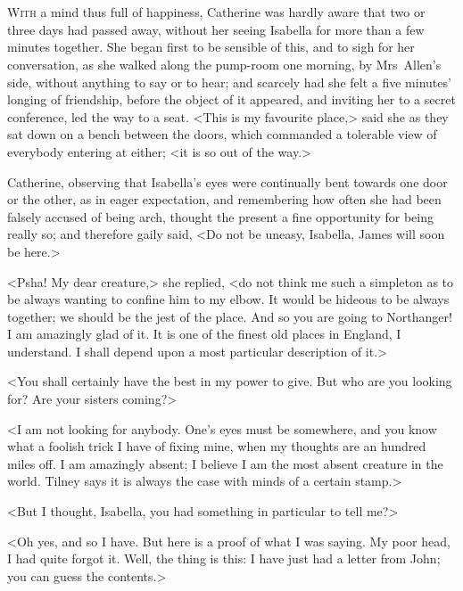 \chapter[Chapter \thechapter]{} 

 \lettrine{W}{ith} a mind thus full of happiness, Catherine was hardly aware that two or three days had passed away, without her seeing Isabella for more than a few minutes together. She began first to be sensible of this, and to sigh for her conversation, as she walked along the pump-room one morning, by Mrs~Allen's side, without anything to say or to hear; and scarcely had she felt a five minutes' longing of friendship, before the object of it appeared, and inviting her to a secret conference, led the way to a seat. <This is my favourite place,> said she as they sat down on a bench between the doors, which commanded a tolerable view of everybody entering at either; <it is so out of the way.> 

 Catherine, observing that Isabella's eyes were continually bent towards one door or the other, as in eager expectation, and remembering how often she had been falsely accused of being arch, thought the present a fine opportunity for being really so; and therefore gaily said, <Do not be uneasy, Isabella, James will soon be here.> 

 <Psha! My dear creature,> she replied, <do not think me such a simpleton as to be always wanting to confine him to my elbow. It would be hideous to be always together; we should be the jest of the place. And so you are going to Northanger! I am amazingly glad of it. It is one of the finest old places in England, I understand. I shall depend upon a most particular description of it.> 

 <You shall certainly have the best in my power to give. But who are you looking for? Are your sisters coming?> 

 <I am not looking for anybody. One's eyes must be somewhere, and you know what a foolish trick I have of fixing mine, when my thoughts are an hundred miles off. I am amazingly absent; I believe I am the most absent creature in the world. Tilney says it is always the case with minds of a certain stamp.> 

 <But I thought, Isabella, you had something in particular to tell me?> 

 <Oh yes, and so I have. But here is a proof of what I was saying. My poor head, I had quite forgot it. Well, the thing is this: I have just had a letter from John; you can guess the contents.> 

